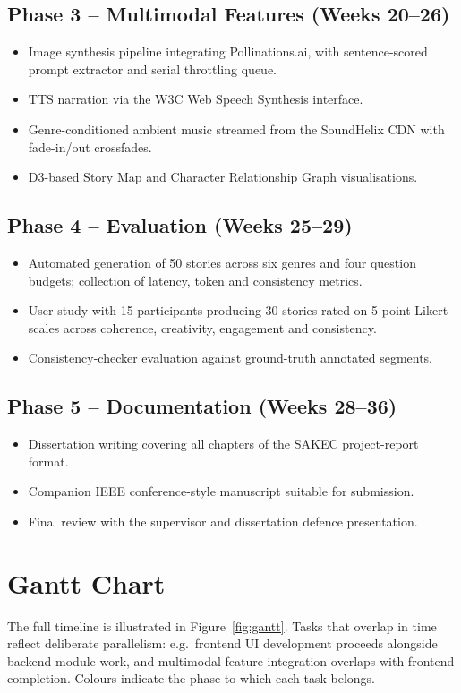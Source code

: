 \subsection{Phase 3 -- Multimodal Features (Weeks 20--26)}
\begin{itemize}
    \item Image synthesis pipeline integrating Pollinations.ai, with
    sentence-scored prompt extractor and serial throttling queue.
    \item TTS narration via the W3C Web Speech Synthesis interface.
    \item Genre-conditioned ambient music streamed from the SoundHelix
    CDN with fade-in/out crossfades.
    \item D3-based Story Map and Character Relationship Graph
    visualisations.
\end{itemize}

\subsection{Phase 4 -- Evaluation (Weeks 25--29)}
\begin{itemize}
    \item Automated generation of 50 stories across six genres and
    four question budgets; collection of latency, token and
    consistency metrics.
    \item User study with 15 participants producing 30 stories rated
    on 5-point Likert scales across coherence, creativity, engagement
    and consistency.
    \item Consistency-checker evaluation against ground-truth
    annotated segments.
\end{itemize}

\subsection{Phase 5 -- Documentation (Weeks 28--36)}
\begin{itemize}
    \item Dissertation writing covering all chapters of the SAKEC
    project-report format.
    \item Companion IEEE conference-style manuscript suitable for
    submission.
    \item Final review with the supervisor and dissertation defence
    presentation.
\end{itemize}

\section{Gantt Chart}
The full timeline is illustrated in Figure~\ref{fig:gantt}. Tasks
that overlap in time reflect deliberate parallelism: e.g.\ frontend
UI development proceeds alongside backend module work, and multimodal
feature integration overlaps with frontend completion. Colours indicate
the phase to which each task belongs.

